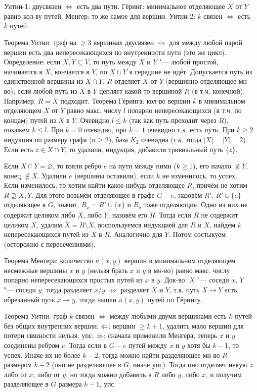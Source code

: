 \section{} %
	Уитни-1: двусвязен $\iff$ есть два пути.
	Гёринг: минимальное отделяющее $X$ от $Y$ равно кол-ву путей.
	Менгер: то же самое для вершин.
	Уитни-2: $k$ связен $\iff$ есть $k$ путей.

	Теорема Уитни: граф на $\ge 3$ вершинах двусвязен $\iff$ для между любой парой вершин
	есть два непересекающихся по внутренности пути (это же цикл).
	Определение: если $X, Y \subseteq V$, то путь между $X$ и $Y$ "--- любой простой,
	начинается в $X$, кончается в $Y$, по $X \cup Y$ в середине не идёт.
	Допускается путь из единственной вершины из $X \cap Y$.
	$R$ отделяет $X$ от $Y$ (вершинно отделяющее мн-во), если любой путь из $X$ в $Y$
	цепляет какой-то вершиной $R$ (в т.ч. конечной).
	Например, $R=X$ подходит.
	Теорема Гёринга: кол-во вершин $k$ в минимальном отделяющем $X$ от $Y$ равно макс. числу $l$ попарно
	непересекающихся (в т.ч. по концам) путей из $X$ в $Y$.
	Очевидно $l \le k$ (так как путь проходит через $R$), покажем $k \le l$.
	При $k=0$ очевидно, при $k=1$ очевидно т.к. есть путь.
	При $k\ge 2$ индукция по размеру графа ($n \ge 2$), база $\overline{K_2}$ очевидна (т.к. тогда $|X|=|Y|=2$).
	Если есть $z\in X \cap Y$, то удалили, индукция, добавили тривиальный путь $\{z\}$.

	Если $X \cap Y =\varnothing$, то взяли ребро $e$ на пути между ними ($k \ge 1$), его начало $\notin Y$, конец $\notin X$.
	Удалили $e$ (вершины оставили), если $k$ не изменилось, то успех.
	Если изменилось, то хотим найти какое-нибудь отделяющее $R$, причём не хотим $R \supseteq X, Y$.
	Для этого возьмём отделяющее в графе $G-e$, назовём $R'$.
	$R' \cup \{e\}$ отделяющее в $G$, значит, $R_x=R'\cup\{x\}$ и $R_y$ тоже отделяющие.
	Одно из них не содержит целиком либо $X$, либо $Y$, назовём его $R$.
	Тогда если $R$ не содержит целиком $X$, удалим $\bar X=R\setminus X$, воспользуемся индукцией для $R$ и $X$,
	найдём $k$ непересекающихся путей из $X$ в $R$.
	Аналогично для $Y$.
	Потом состыкуем (осторожно с пересечениями).

	Теорема Менгера: количество $\kappa(x, y)$ вершин в минимальном отделяющем несмежные вершины $x$ и $y$ (нельзя брать $x$ и $y$ в мн-во)
	равно макс. числу попарно непересекающихся простых путей из $x$ в $y$.
	Док-во: $X$ "--- соседи $x$, $Y$ "--- соседи $y$, тогда разделяет $x$/$y$ $\iff$ разделяет $X$ и $Y$,
	т.к. путь $X \to Y$ есть обрезанный путь $x \to y$, тогда нашли $\kappa(x, y)$ путей по Гёрингу.

	Теорема Уитни: граф $k$-связен $\iff$ между любыми двумя вершинами есть $k$ путей без общих внутренних вершин.
	$\Leftarrow$: вершин $\ge k+1$, удалить мало вершин для потери связности нельзя, упс.
	$\Rightarrow$: сначала применили Менгера, теперь $x$ и $y$ соединены ребром $e$.
	Тогда если в $G-e$ путей между $x$ и $y$ хотя бы $k-1$, то успех.
	Иначе их не более $k-2$, тогда можно найти разделяющее мн-во $R$ размером $k-2$ (оно не разделяющее в $G$, иначе упс).
	Тогда оно отделяет некую $z$ либо от $x$, либо от $y$, но тогда можно добавить в $R$ либо $y$, либо $x$, и получим разделяющее в $G$ размера $k-1$, упс.

